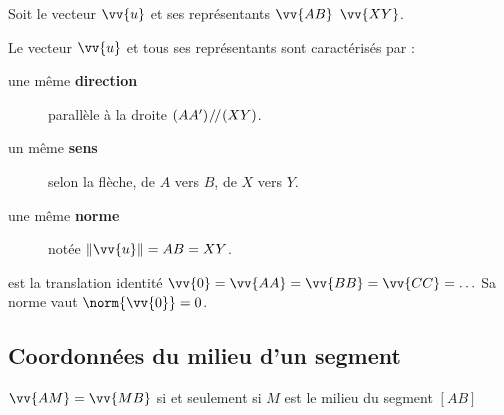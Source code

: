 \documentclass[main.tex]{subfiles}
\begin{document}
\begin{definition} Soit le vecteur $\vv{u}$ et ses représentants $\vv{AB}$  $\vv{XY}$. 
	
	Le vecteur $\vv{u}$ et tous ses représentants sont caractérisés par :
	\begin{description}
		\item[une même \textbf{direction}] parallèle à la droite $\left( {AA'} \right)\mathbin{\!/\mkern-2mu/\!}  \left( {XY} \right)$.
		\item[un même \textbf{sens}] selon la flèche, de $A$ vers $B$, de $X$ vers $Y$.
		\item[une même \textbf{norme}] notée $\left\| \vv{u} \right\|= AB=XY$.
	\end{description}  
\end{definition} 


\begin{definition} est la translation identité  
	$ \vv{0}=\vv{AA}=\vv{BB}=\vv{CC}=\ldots$ Sa norme vaut $\norm{\vv{0}}=0$.
\end{definition}   

%	 
\newpage  
\subsection{Coordonnées du milieu d'un segment}
\begin{tBox}
	$\vv{AM}=\vv{MB}$ si et seulement si $M$ est le milieu du segment $[AB]$ 
\end{tBox} 
\end{document}
